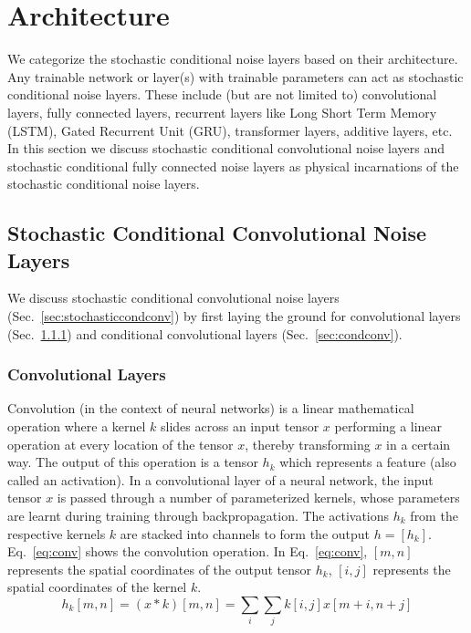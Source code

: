 \documentclass[12pt, letterpaper]{article}
\begin{document}
\section{Architecture}
\vspace{-0.2cm}
We categorize the stochastic conditional noise layers based on their architecture.
Any trainable network or layer(s) with trainable parameters can act as stochastic conditional noise layers. 
These include (but are not limited to) convolutional layers, fully connected layers, recurrent layers like Long Short Term Memory (LSTM), Gated Recurrent Unit (GRU), transformer layers, additive layers, etc. In this section we discuss stochastic conditional convolutional noise layers and  stochastic conditional fully connected noise layers as physical incarnations of the stochastic conditional noise layers. 

\subsection{Stochastic Conditional Convolutional Noise Layers}
We discuss stochastic conditional convolutional noise layers (Sec.~\ref{sec:stochasticcondconv}) by first laying the ground for convolutional layers (Sec.~\ref{sec:conv}) and conditional convolutional layers (Sec.~\ref{sec:condconv}).

\subsubsection{Convolutional Layers}
\label{sec:conv}
Convolution (in the context of neural networks) is a linear mathematical operation where a kernel $k$ slides across an input tensor $x$ performing a linear operation at every location of the tensor $x$, thereby transforming $x$ in a certain way. 
The output of this operation is a tensor $h_k$ which represents a feature (also called an activation). 
In a convolutional layer of a neural network, the input tensor $x$ is passed through a number of parameterized kernels, whose parameters are learnt during training through backpropagation. 
The activations $h_k$ from the respective kernels $k$ are stacked into channels to form the output $h=[h_k]$. Eq.~\eqref{eq:conv} shows the convolution operation. 
In Eq.~\eqref{eq:conv}, $[m,n]$ represents the spatial coordinates of the output tensor $h_k$, $[i,j]$ represents the spatial coordinates of the kernel $k$.
\begin{equation}
  h_k[m,n]=(x * k)[m,n]=\sum_i \sum_j k[i,j]x[m+i,n+j]
  \label{eq:conv}
\end{equation}
\end{document}
